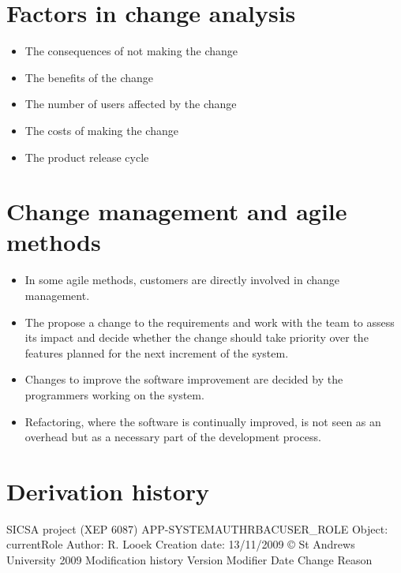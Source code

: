 \section{Factors in change analysis}
\begin{itemize}

\item The consequences of not making the change

\item The benefits of the change

\item The number of users affected by the change

\item The costs of making the change

\item The product release cycle

\end{itemize}
\section{Change management and agile methods}
\begin{itemize}
\item In some agile methods, customers are directly involved in change management.

\item The propose a change to the requirements and work with the team to assess its impact and decide whether the change should take priority over the features planned for the next increment of the system.

\item Changes to improve the software improvement are decided by the programmers working on the system.

\item Refactoring, where the software is continually improved, is not seen as an overhead but as a necessary part of the development process.

\end{itemize}
\section{Derivation history}


SICSA project (XEP 6087)
\newline
APP-SYSTEM\/AUTH\/RBAC\/USER\_ROLE
\newline
Object: currentRole
\newline
Author: R. Looek
\newline
Creation date: 13/11/2009
\newline
© St Andrews University 2009
\newline
Modification history
\newline
Version Modifier Date	Change	Reason

